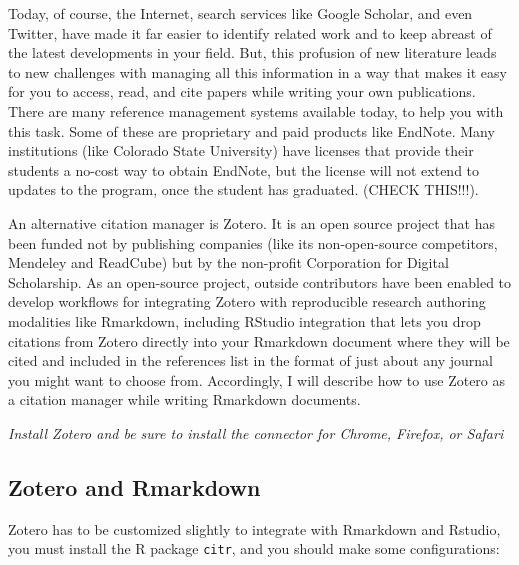 \documentclass[]{krantz}
\begin{document}
Today, of course, the Internet, search services like Google Scholar, and even Twitter,
have made it far easier to identify related work and to keep abreast of the latest
developments in your field. But, this profusion of new literature leads to new challenges
with managing all this information in a way that makes it easy for you to access, read, and
cite papers while writing your own publications. There are many reference management
systems available today, to help you with this task. Some of these are proprietary and paid
products like EndNote. Many institutions (like Colorado State University) have licenses that provide
their students a no-cost way to obtain EndNote, but the license will not extend to updates to
the program, once the student has graduated. (CHECK THIS!!!).

An alternative citation manager is Zotero. It is an open source project that has been funded
not by publishing companies (like its non-open-source competitors, Mendeley and ReadCube) but
by the non-profit Corporation for Digital Scholarship. As an open-source project, outside
contributors have been enabled to develop workflows for integrating Zotero with reproducible
research authoring modalities like Rmarkdown, including RStudio integration that lets you
drop citations from Zotero directly into your Rmarkdown document where they will be cited
and included in the references list in the format of just about any journal you might
want to choose from. Accordingly, I will describe how to use Zotero as a citation manager
while writing Rmarkdown documents.

\emph{Install Zotero and be sure to install the connector for Chrome, Firefox, or Safari}

\hypertarget{zotero-and-rmarkdown}{%
\subsection{Zotero and Rmarkdown}\label{zotero-and-rmarkdown}}

Zotero has to be customized slightly to integrate with Rmarkdown and Rstudio, you must
install the R package \texttt{citr}, and you should make some configurations:
\end{document}
